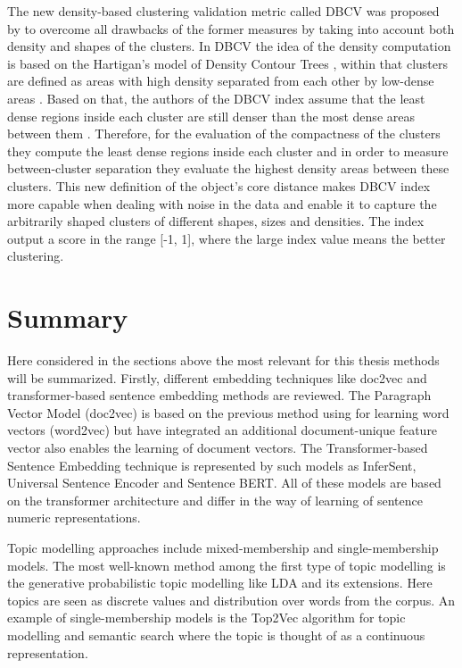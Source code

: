 \documentclass[fontsize=12pt,a4paper,twoside,openany]{scrbook}
\begin{document}
The new density-based clustering validation metric called DBCV was proposed by \textcite{Moulavi14} to overcome all drawbacks of the former measures by taking into account both density and shapes of the clusters. In DBCV the idea of the density computation is based on the Hartigan’s model of Density Contour Trees \parencite{Hartigan75}, within that clusters are defined as areas with high density separated from each other by low-dense areas \parencite{Moulavi14, Hartigan75}. Based on that, the authors of the DBCV index assume that the least dense regions inside each cluster are still denser than the most dense areas between them \parencite{Moulavi14}. Therefore, for the evaluation of the compactness of the clusters they compute the least dense regions inside each cluster and in order to measure between-cluster separation they evaluate the highest density areas between these clusters. This new definition of the object's core distance makes DBCV index more capable when dealing with noise in the data and enable it to capture the arbitrarily shaped clusters of different shapes, sizes and densities. The index output a score in the range [-1, 1], where the large index value means the better clustering.

\section{Summary}
Here considered in the sections above the most relevant for this thesis methods will be summarized. Firstly, different embedding techniques like doc2vec and transformer-based sentence embedding methods are reviewed. The Paragraph Vector Model (doc2vec) is based on the previous method using for learning word vectors (word2vec) but have integrated an additional document-unique feature vector also enables the learning of document vectors. The Transformer-based Sentence Embedding technique is represented by such models as InferSent, Universal Sentence Encoder and Sentence BERT. All of these models are based on the transformer architecture and differ in the way of learning of sentence numeric representations.

Topic modelling approaches include mixed-membership and single-membership models. The most well-known method among the first type of topic modelling is the generative probabilistic topic modelling like LDA and its extensions. Here topics are seen as discrete values and distribution over words from the corpus. An example of single-membership models is the Top2Vec algorithm for topic modelling and semantic search where the topic is thought of as a continuous representation.
\end{document}
